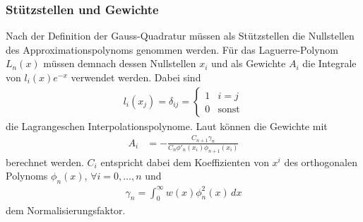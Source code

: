 \subsubsection{Stützstellen und Gewichte}
Nach der Definition der Gauss-Quadratur müssen als Stützstellen die Nullstellen
des Approximationspolynoms genommen werden.
Für das Laguerre-Polynom $L_n(x)$ müssen demnach dessen Nullstellen $x_i$ und
als Gewichte $A_i$ die Integrale von $l_i(x) e^{-x}$ verwendet werden.
Dabei sind
\begin{align*}
l_i(x_j)
=
\delta_{ij}
=
\begin{cases}
1 & i=j          \\
0 & \text{sonst}
\end{cases}
\end{align*}
die Lagrangeschen Interpolationspolynome.
Laut \cite{laguerre:hildebrand2013introduction} können die Gewichte mit
\begin{align*}
A_i
 & =
-\frac{C_{n+1} \gamma_n}{C_n \phi'_n(x_i) \phi_{n+1} (x_i)}
\end{align*}
berechnet werden.
$C_i$ entspricht dabei dem Koeffizienten von $x^i$
des orthogonalen Polynoms $\phi_n(x)$, $\forall i =0,\ldots,n$ und
\begin{align*}
\gamma_n
=
\int_0^\infty w(x) \phi_n^2(x)\,dx
\end{align*}
dem Normalisierungsfaktor.

